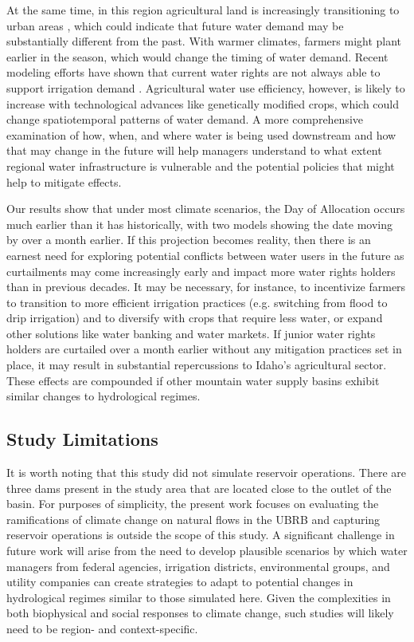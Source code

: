\documentclass[11pt,letterpaper]{article}
\begin{document}
At the same time, in this region agricultural land is increasingly transitioning to urban areas \citep{Dahal:2017ux}, which could indicate that future water demand may be substantially different from the past. With warmer climates, farmers might plant earlier in the season, which would change the timing of water demand. Recent modeling efforts have shown that current water rights are not always able to support irrigation demand \citep{Deb:2015vp,Han:2017tx}. Agricultural water use efficiency, however, is likely to increase with technological advances like genetically modified crops, which could change spatiotemporal patterns of water demand. A more comprehensive examination of how, when, and where water is being used downstream and how that may change in the future will help managers understand to what extent regional water infrastructure is vulnerable and the potential policies that might help to mitigate effects. 

Our results show that under most climate scenarios, the Day of Allocation occurs much earlier than it has historically, with two models showing the date moving by over a month earlier. If this projection becomes reality, then there is an earnest need for exploring potential conflicts between water users in the future as curtailments may come increasingly early and impact more water rights holders than in previous decades. It may be necessary, for instance, to incentivize farmers to transition to more efficient irrigation practices (e.g. switching from flood to drip irrigation) and to diversify with crops that require less water, or expand other solutions like water banking and water markets. If junior water rights holders are curtailed over a month earlier without any mitigation practices set in place, it may result in substantial repercussions to Idaho’s agricultural sector. These effects are compounded if other mountain water supply basins exhibit similar changes to hydrological regimes. 

\subsection{Study Limitations}

It is worth noting that this study did not simulate reservoir operations. There are three dams present in the study area that are located close to the outlet of the basin. For purposes of simplicity, the present work focuses on evaluating the ramifications of climate change on natural flows in the UBRB and capturing reservoir operations is outside the scope of this study. A significant challenge in future work will arise from the need to develop plausible scenarios by which water managers from federal agencies, irrigation districts, environmental groups, and utility companies can create strategies to adapt to potential changes in hydrological regimes similar to those simulated here. Given the complexities in both biophysical and social responses to climate change, such studies will likely need to be region- and context-specific.  
\end{document}
